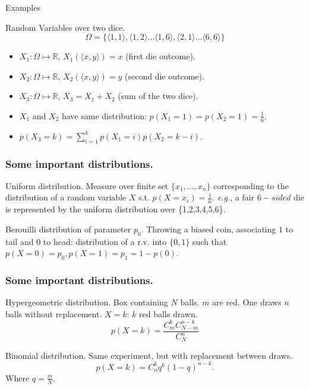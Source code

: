 \documentclass{beamer}
\begin{document}
\begin{frame}{Examples}
  \begin{exampleblock}{Random Variables over two dice.}
    \[\Omega = \{\langle 1,1 \rangle, \langle 1,2 \rangle \dots \langle 1,6 \rangle, \langle 2,1 \rangle \dots \langle 6,6 \rangle\}\]
    \begin{itemize}
    \item $X_1: \Omega \mapsto \mathbb{R}$, $X_1(\langle x,y \rangle) = x$ (first die outcome).
    \item $X_2: \Omega \mapsto \mathbb{R}$, $X_2(\langle x,y \rangle) = y$ (second die outcome).
    \item $X_3: \Omega \mapsto \mathbb{R}$, $X_3 = X_1 + X_2$ (sum of the two dice).
    \end{itemize}
  \end{exampleblock}

  \begin{itemize}
  \item $X_1$ and $X_2$ have same distribution: $p(X_1 = 1) = p(X_2 = 1) = \frac{1}{6}$.
  \item $p(X_3 = k) = \sum^{k}_{i=1} p(X_1 = i)p(X_2 = k - i)$. 
  \end{itemize}  
\end{frame}

\begin{frame}
  \frametitle{Some important distributions.}

  \begin{exampleblock}{Uniform distribution.}
    Measure over finite set $\{x_1, \dots, x_n\}$ corresponding to the distribution of a random variable $X$ s.t. $p(X = x_i) = \frac{1}{n}$. \emph{e.g.}, a fair $6-sided$ die is represented by the uniform distribution over \{1,2,3,4,5,6\}.
  \end{exampleblock}

  \begin{exampleblock}{Berouilli distribution of parameter $p_0$.}
    Throwing a biased coin, associating $1$ to tail and $0$ to head: distribution of a r.v. into $\{0, 1\}$ such that $p(X = 0) = p_0, p(X = 1) = p_1 = 1 - p(0)$.
  \end{exampleblock}
\end{frame}

\begin{frame}
  \frametitle{Some important distributions.}
  \begin{exampleblock}{Hypergeometric distribution.}
    Box containing $N$ balls. $m$ are red. One draws $n$ balls without replacement. $X = k$: $k$ red balls drawn.
    \[
    p(X = k) = \frac{C^k_mC^{n-k}_{N-m}}{C^n_N}
    \]
  
  \end{exampleblock}

  \begin{exampleblock}{Binomial distribution.}
    Same experiment, but with replacement between draws.
    \[
    p(X = k) = C^k_nq^{k}(1 - q)^{n-k}.
    \]
    Where $q = \frac{m}{N}$.
  \end{exampleblock}
\end{frame}
\end{document}
